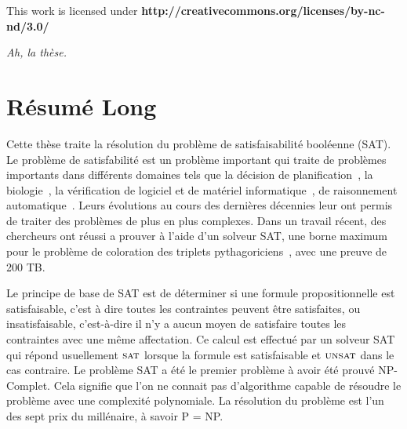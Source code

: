 \clearpage\null\vfill
\thispagestyle{empty}
\begin{minipage}[b]{.9\textwidth}
  \begin{center}
  \setlength{\parskip}{.5\baselineskip}
  {\color{phdcol0}%
   \ccLogo\hspace{.1cm}%
   \ccAttribution\hspace{.1cm}%
   \ccNonCommercial\hspace{.1cm}%
   \ccNoDerivatives}\hspace{.15cm}%
  \footnotesize%
  This work is licensed under {\color{phdcol1}\textbf{http://creativecommons.org/licenses/by-nc-nd/3.0/}}
  \end{center}
\end{minipage}
\vspace*{2\baselineskip}

\clearpage

\thispagestyle{empty}
\begin{flushright}
  \textit{Ah, la thèse.}
\end{flushright}
%
%
%

%
\chapter*{Résumé Long}


Cette thèse traite la résolution du problème de satisfaisabilité booléenne (SAT).
Le problème de satisfabilité est un problème important qui traite de problèmes importants dans différents domaines tels 
que la décision de planification~\cite{planning_92}, la biologie~\cite{biology_06}, la vérification de logiciel et de 
matériel informatique~\cite{biere1999symbolic}, de raisonnement automatique~\cite{heule2016solving}.
Leurs évolutions au cours des dernières décennies leur ont permis de traiter des problèmes de plus en plus complexes.
Dans un travail récent, des chercheurs ont réussi a prouver à l'aide d'un solveur SAT, une borne maximum
pour le problème de coloration des triplets pythagoriciens~\cite{heule2016solving}, avec une preuve de 200 TB.


Le principe de base de SAT est de déterminer si une formule propositionnelle
est satisfaisable, c'est à dire toutes les contraintes peuvent être satisfaites,
ou insatisfaisable, c'est-à-dire il n'y a aucun moyen de satisfaire toutes les contraintes avec une même affectation.
Ce calcul est effectué par un solveur SAT qui répond usuellement $\textsc{sat}$ lorsque la formule est satisfaisable et $\textsc{unsat}$ dans le cas
contraire.
Le problème SAT a été le premier problème à avoir été prouvé NP-Complet. Cela signifie que
l'on ne connait pas d'algorithme capable de résoudre le problème avec une complexité polynomiale.
La résolution du problème est l'un des sept prix du millénaire, à savoir P = NP.


